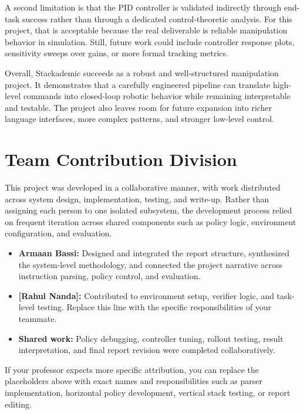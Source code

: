 \documentclass[10pt,letterpaper,twocolumn]{article}
\begin{document}
A second limitation is that the PID controller is validated indirectly through end-task success rather than through a dedicated control-theoretic analysis. For this project, that is acceptable because the real deliverable is reliable manipulation behavior in simulation. Still, future work could include controller response plots, sensitivity sweeps over gains, or more formal tracking metrics.

Overall, Stackademic succeeds as a robust and well-structured manipulation project. It demonstrates that a carefully engineered pipeline can translate high-level commands into closed-loop robotic behavior while remaining interpretable and testable. The project also leaves room for future expansion into richer language interfaces, more complex patterns, and stronger low-level control.

\section{Team Contribution Division}
This project was developed in a collaborative manner, with work distributed across system design, implementation, testing, and write-up. Rather than assigning each person to one isolated subsystem, the development process relied on frequent iteration across shared components such as policy logic, environment configuration, and evaluation.

\begin{itemize}[leftmargin=1.2em]
    \item \textbf{Armaan Bassi:} Designed and integrated the report structure, synthesized the system-level methodology, and connected the project narrative across instruction parsing, policy control, and evaluation.
    \item \textbf{[Rahul Nanda]:} Contributed to environment setup, verifier logic, and task-level testing. Replace this line with the specific responsibilities of your teammate.
    \item \textbf{Shared work:} Policy debugging, controller tuning, rollout testing, result interpretation, and final report revision were completed collaboratively.
\end{itemize}

If your professor expects more specific attribution, you can replace the placeholders above with exact names and responsibilities such as parser implementation, horizontal policy development, vertical stack testing, or report editing.
\end{document}
